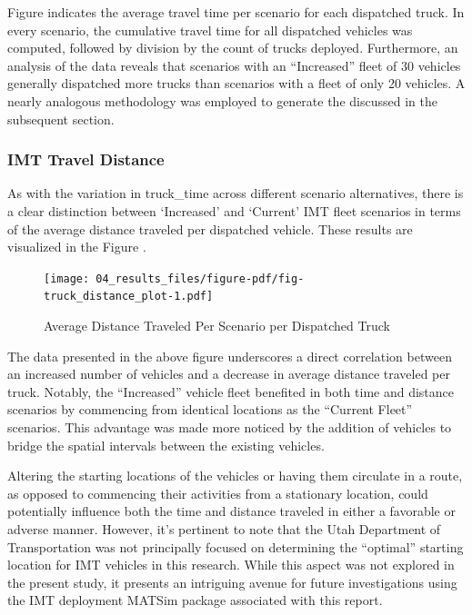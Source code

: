 \documentclass[
  letterpaper,
  authoryear]{elsarticle}
\begin{document}
Figure \citet{truck_time_plot} indicates the average travel time per
scenario for each dispatched truck. In every scenario, the cumulative
travel time for all dispatched vehicles was computed, followed by
division by the count of trucks deployed. Furthermore, an analysis of
the \citet{truck_csv} data reveals that scenarios with an ``Increased''
fleet of 30 vehicles generally dispatched more trucks than scenarios
with a fleet of only 20 vehicles. A nearly analogous methodology was
employed to generate the \citet{truck_distance_plot} discussed in the
subsequent section.

\hypertarget{imt-travel-distance}{%
\subsubsection{IMT Travel Distance}\label{imt-travel-distance}}

As with the variation in truck\_time across different scenario
alternatives, there is a clear distinction between `Increased' and
`Current' IMT fleet scenarios in terms of the average distance traveled
per dispatched vehicle. These results are visualized in the Figure
\citet{truck_distance_plot}.

\begin{figure}

{\centering \texttt{[image: 04\_results\_files/figure-pdf/fig-truck\_distance\_plot-1.pdf]}

}

\caption{\label{fig-truck_distance_plot}Average Distance Traveled Per
Scenario per Dispatched Truck}

\end{figure}

The data presented in the above figure underscores a direct correlation
between an increased number of vehicles and a decrease in average
distance traveled per truck. Notably, the ``Increased'' vehicle fleet
benefited in both time and distance scenarios by commencing from
identical locations as the ``Current Fleet'' scenarios. This advantage
was made more noticed by the addition of vehicles to bridge the spatial
intervals between the existing vehicles.

Altering the starting locations of the vehicles or having them circulate
in a route, as opposed to commencing their activities from a stationary
location, could potentially influence both the time and distance
traveled in either a favorable or adverse manner. However, it's
pertinent to note that the Utah Department of Transportation was not
principally focused on determining the ``optimal'' starting location for
IMT vehicles in this research. While this aspect was not explored in the
present study, it presents an intriguing avenue for future
investigations using the IMT deployment MATSim package associated with
this report.
\end{document}

